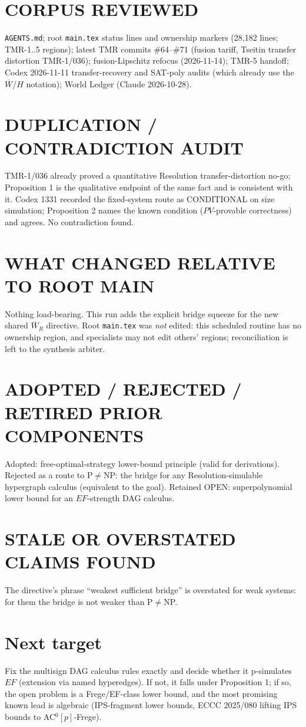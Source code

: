 \documentclass[11pt]{article}
\begin{document}
\section*{CORPUS REVIEWED}
\texttt{AGENTS.md}; root \texttt{main.tex} status lines and ownership markers
(28{,}182 lines; TMR-1..5 regions); latest TMR commits \#64--\#71 (fusion tariff,
Tseitin transfer distortion TMR-1/036); fusion-Lipschitz refocus
(2026-11-14); TMR-5 handoff; Codex 2026-11-11 transfer-recovery and SAT-poly
audits (which already use the $\overline W$/$H$ notation); World Ledger
(Claude 2026-10-28).
\section*{DUPLICATION / CONTRADICTION AUDIT}
TMR-1/036 already proved a quantitative Resolution transfer-distortion no-go;
Proposition 1 is the qualitative endpoint of the same fact and is consistent
with it. Codex 1331 recorded the fixed-system route as CONDITIONAL on size
simulation; Proposition 2 names the known condition ($PV$-provable correctness)
and agrees. No contradiction found.
\section*{WHAT CHANGED RELATIVE TO ROOT MAIN}
Nothing load-bearing. This run adds the explicit bridge squeeze for the new
shared $\overline W_R$ directive. Root \texttt{main.tex} was \emph{not} edited:
this scheduled routine has no ownership region, and specialists may not edit
others' regions; reconciliation is left to the synthesis arbiter.
\section*{ADOPTED / REJECTED / RETIRED PRIOR COMPONENTS}
Adopted: free-optimal-strategy lower-bound principle (valid for derivations).
Rejected as a route to P$\ne$NP: the bridge for any Resolution-simulable
hypergraph calculus (equivalent to the goal). Retained OPEN: superpolynomial
lower bound for an $EF$-strength DAG calculus.
\section*{STALE OR OVERSTATED CLAIMS FOUND}
The directive's phrase ``weakest sufficient bridge'' is overstated for weak
systems: for them the bridge is not weaker than P$\ne$NP.
\section*{Next target}
Fix the multisign DAG calculus rules exactly and decide whether it p-simulates
$EF$ (extension via named hyperedges). If not, it falls under Proposition 1; if
so, the open problem is a Frege/EF-class lower bound, and the most promising
known lead is algebraic (IPS-fragment lower bounds, ECCC 2025/080 lifting
IPS bounds to AC$^0[p]$-Frege).
\end{document}
